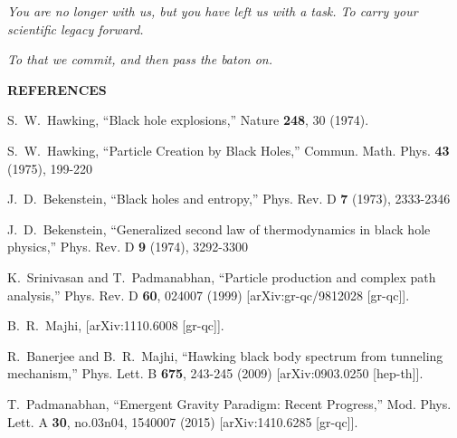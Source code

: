 \documentclass[prd, preprint, longbibliography, 11pt]{revtex4-1}
\begin{document}
\medskip



\centerline{\it You are no longer with us, but you have left us with a task. To carry  your scientific legacy forward.}
\centerline{\it To that we commit, and then pass the baton on.}

\bigskip



\bigskip


\newpage

\centerline{\bf REFERENCES}

\begin{thebibliography}{9}
S.~W.~Hawking,
``Black hole explosions,''
Nature {\bf 248}, 30 (1974).

S.~W.~Hawking,
``Particle Creation by Black Holes,''
Commun. Math. Phys. \textbf{43} (1975), 199-220

J.~D.~Bekenstein,
``Black holes and entropy,''
Phys. Rev. D \textbf{7} (1973), 2333-2346

J.~D.~Bekenstein,
``Generalized second law of thermodynamics in black hole physics,''
Phys. Rev. D \textbf{9} (1974), 3292-3300

K.~Srinivasan and T.~Padmanabhan,
``Particle production and complex path analysis,''
Phys. Rev. D \textbf{60}, 024007 (1999)
[arXiv:gr-qc/9812028 [gr-qc]].

B.~R.~Majhi,
[arXiv:1110.6008 [gr-qc]].

R.~Banerjee and B.~R.~Majhi,
``Hawking black body spectrum from tunneling mechanism,''
Phys. Lett. B \textbf{675}, 243-245 (2009)
[arXiv:0903.0250 [hep-th]].

T.~Padmanabhan,
``Emergent Gravity Paradigm: Recent Progress,''
Mod. Phys. Lett. A \textbf{30}, no.03n04, 1540007 (2015)
[arXiv:1410.6285 [gr-qc]].


\end{thebibliography}
\end{document}
